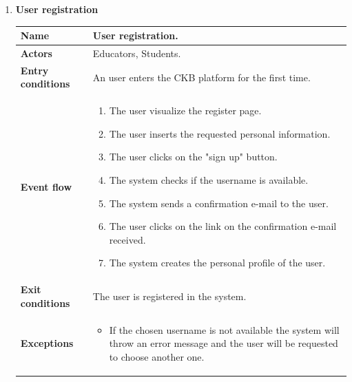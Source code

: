     \begin{enumerate}[label=\textbf{UC.\arabic*}]
        \item {} \textbf{User registration}
        \begin{table}[H]
    	    \centering
                \renewcommand{\arraystretch}{1.5}
                \begin{tabular}{|m{3.2cm}|m{9.8cm}|}
                    \hline
                    \textbf{Name} & User registration. \\
                    \hline
                    \textbf{Actors} & Educators, Students. \\
                    \hline
                    \textbf{Entry conditions}  & An user enters the CKB platform for the first time. \\
                    \hline
                    \textbf{Event flow}  & 
                    \begin{enumerate}[label=\arabic*.]
                        \item The user visualize the register page.
                        \item The user inserts the requested personal information.
                        \item The user clicks on the "sign up" button.
                        \item The system checks if the username is available.
                        \item The system sends a confirmation e-mail to the user.
                        \item The user clicks on the link on the confirmation e-mail received.
                        \item The system creates the personal profile of the user.
                    \end{enumerate}\\
                    \hline
                    \textbf{Exit conditions}  & The user is registered in the system. \\
                    \hline
                    \textbf{Exceptions}  & 
                    \begin{itemize}
                        \item If the chosen username is not available the system will throw an error message and the user will be requested to choose another one.
                    \end{itemize} \\
                    \hline 

\end{tabular}
\end{table}
\end{enumerate}

